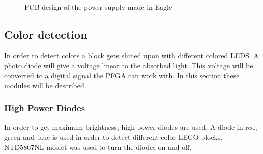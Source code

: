 \begin{figure}
\centering
{}
\caption{PCB design of the power supply made in Eagle} 
\label{fig::pcb_power}
\end{figure}

\subsection{Color detection}
In order to detect colors a block gets shined upon with different colored LEDS.
A photo diode will give a voltage linear to the absorbed light.
This voltage will be converted to a digital signal the PFGA can work with.
In this section these modules will be described.
\subsubsection{High Power Diodes}
In order to get maximum brightness, high power diodes are used.
A diode in red, green and blue is used in order to detect different color LEGO blocks.
NTD5867NL mosfet was used to turn the diodes on and off.

